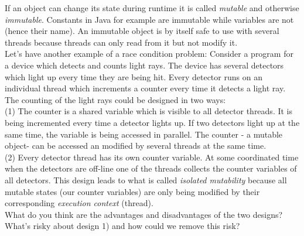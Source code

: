 \documentclass{scrreprt}
\begin{document}
If an object can change its state during runtime it is called \textit{mutable} and otherwise \textit{immutable}. Constants in Java for example are immutable while variables are not (hence their name). An immutable object is by itself safe to use with several threads because threads can only read from it but not modify it. \\

Let's have another example of a race condition problem: Consider a program for a device which detects and counts light rays. The device has several detectors which light up every time they are being hit. Every detector runs on an individual thread which increments a counter every time it detects a light ray. The counting of the light rays could be designed in two ways: \\

(1) The counter is a shared variable which is visible to all detector threads. It is being incremented every time a detector lights up. If two detectors light up at the same time, the variable is being accessed in parallel. The counter - a mutable object- can be accessed an modified by several threads at the same time. \\

(2) Every detector thread has its own counter variable. At some coordinated time when the detectors are off-line one of the threads collects the counter variables of all detectors. This design leads to what is called \textit{isolated mutability} because all mutable states (our counter variables) are only being modified by their corresponding \textit{execution context} (thread). \\

What do you think are the advantages and disadvantages of the two designs? What's risky about design 1) and how could we remove this risk? \\
\end{document}

